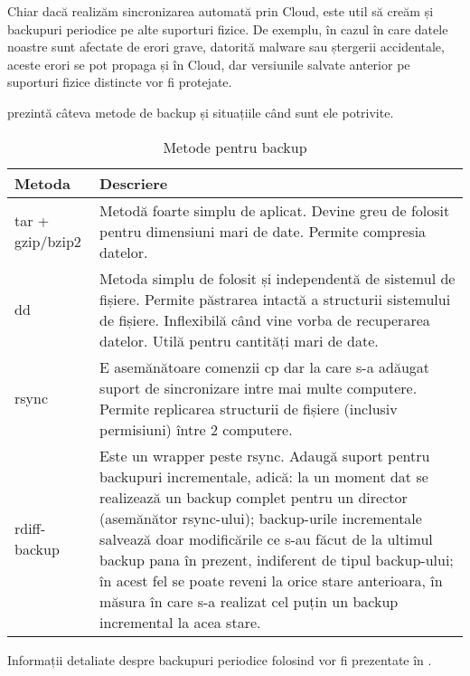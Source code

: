 Chiar dacă realizăm sincronizarea automată prin Cloud, este util să creăm și backupuri periodice pe alte suporturi fizice. De exemplu, în cazul în care datele noastre sunt afectate de erori grave, datorită malware sau ștergerii accidentale, aceste erori se pot propaga și în Cloud, dar versiunile salvate anterior pe suporturi fizice distincte vor fi protejate.

 prezintă câteva metode de backup și situațiile când sunt ele
potrivite.

\begin{table}[htb]
  \begin{center}
    \begin{tabular}{ p{} p{} }
      \toprule
        \textbf{Metoda} & \textbf{Descriere} \\
      \midrule
        tar + gzip/bzip2 & Metodă foarte simplu de aplicat. Devine greu de folosit pentru dimensiuni mari de date. Permite compresia
        datelor. \\
      \midrule
        dd & Metoda simplu de folosit și independentă de sistemul de fișiere. Permite păstrarea intactă a structurii sistemului de fișiere. Inflexibilă când vine vorba de recuperarea datelor.  Utilă pentru cantități mari de date. \\
      \midrule
        rsync & E asemănătoare comenzii cp dar la care s-a adăugat suport de sincronizare intre mai multe computere. Permite replicarea structurii de fișiere (inclusiv permisiuni) între 2
        computere. \\
      \midrule
        rdiff-backup & Este un wrapper peste rsync. Adaugă suport pentru backupuri incrementale, adică: la un moment dat se realizează un backup complet pentru un director (asemănător rsync-ului); backup-urile incrementale salvează doar modificările ce s-au făcut de la ultimul backup pana în prezent, indiferent de tipul backup-ului; în acest fel se poate reveni la orice stare anterioara, în măsura în care s-a realizat cel puțin un backup incremental la acea stare. \\
      \bottomrule
    \end{tabular}
  \end{center}
  \caption{Metode pentru backup}
  \label{table:file-system-backup-cmd}
\end{table}

Informații detaliate despre backupuri periodice folosind  vor fi prezentate în .

